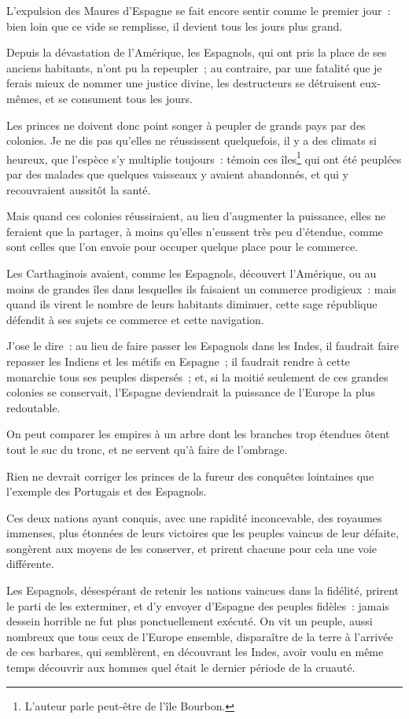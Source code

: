 \documentclass[french,twoside]{book} %
\begin{document}
L’expulsion des Maures d’Espagne se fait encore sentir comme le premier jour : bien loin que ce vide se remplisse, il devient tous les jours plus grand.\par
Depuis la dévastation de l’Amérique, les Espagnols, qui ont pris la place de ses anciens habitants, n’ont pu la repeupler ; au contraire, par une fatalité que je ferais mieux de nommer une justice divine, les destructeurs se détruisent eux-mêmes, et se consument tous les jours.\par
Les princes ne doivent donc point songer à peupler de grands pays par des colonies. Je ne dis pas qu’elles ne réussissent quelquefois, il y a des climats si heureux, que l’espèce s’y multiplie toujours : témoin ces îles\footnote{L'auteur parle peut-être de l’île Bourbon.} qui ont été peuplées par des malades que quelques vaisseaux y avaient abandonnés, et qui y recouvraient aussitôt la santé.\par
Mais quand ces colonies réussiraient, au lieu d’augmenter la puissance, elles ne feraient que la partager, à moins qu’elles n’eussent très peu d’étendue, comme sont celles que l’on envoie pour occuper quelque place pour le commerce.\par
Les Carthaginois avaient, comme les Espagnols, découvert l’Amérique, ou au moins de grandes îles dans lesquelles ils faisaient un commerce prodigieux : mais quand ils virent le nombre de leurs habitants diminuer, cette sage république défendit à ses sujets ce commerce et cette navigation.\par
J’ose le dire : au lieu de faire passer les Espagnols dans les Indes, il faudrait faire repasser les Indiens et les métifs en Espagne ; il faudrait rendre à cette monarchie tous ses peuples dispersés ; et, si la moitié seulement de ces grandes colonies se conservait, l’Espagne deviendrait la puissance de l’Europe la plus redoutable.\par
On peut comparer les empires à un arbre dont les branches trop étendues ôtent tout le suc du tronc, et ne servent qu’à faire de l’ombrage.\par
Rien ne devrait corriger les princes de la fureur des conquêtes lointaines que l’exemple des Portugais et des Espagnols.\par
Ces deux nations ayant conquis, avec une rapidité inconcevable, des royaumes immenses, plus étonnées de leurs victoires que les peuples vaincus de leur défaite, songèrent aux moyens de les conserver, et prirent chacune pour cela une voie différente.\par
Les Espagnols, désespérant de retenir les nations vaincues dans la fidélité, prirent le parti de les exterminer, et d’y envoyer d’Espagne des peuples fidèles : jamais dessein horrible ne fut plus ponctuellement exécuté. On vit un peuple, aussi nombreux que tous ceux de l’Europe ensemble, disparaître de la terre à l’arrivée de ces barbares, qui semblèrent, en découvrant les Indes, avoir voulu en même temps découvrir aux hommes quel était le dernier période de la cruauté.\par
\end{document}
